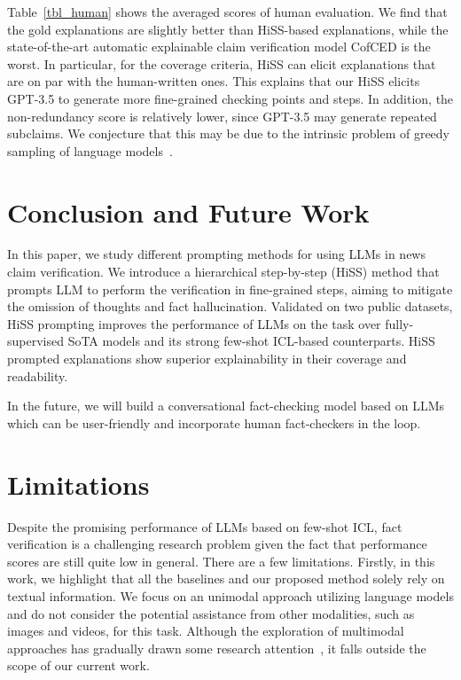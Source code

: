 \documentclass[11pt]{article}
\begin{document}
Table~\ref{tbl_human} shows the averaged scores of human evaluation. We find that the gold explanations are slightly better than HiSS-based explanations, while the state-of-the-art automatic explainable claim verification model CofCED is the worst. In particular, for the coverage criteria, HiSS can elicit explanations that are on par with the human-written ones. This explains that our HiSS elicits GPT-3.5 to generate more fine-grained checking points and steps. In addition, the non-redundancy score is relatively lower, since GPT-3.5 may generate repeated subclaims. We conjecture that this may be due to the intrinsic problem of greedy sampling of language models~\cite{holtzman2019curious}.


\section{Conclusion and Future Work}
In this paper, we study different prompting methods for using LLMs in news claim verification. We introduce a hierarchical step-by-step (HiSS) method that prompts LLM to perform the verification in fine-grained steps, aiming to mitigate the omission of thoughts and fact hallucination.
Validated on two public datasets, HiSS prompting improves the performance of LLMs on the task over fully-supervised SoTA models and its strong few-shot ICL-based counterparts. HiSS prompted explanations show superior explainability in their coverage and readability.

In the future, we will build a conversational fact-checking model based on LLMs which can be user-friendly and incorporate human fact-checkers in the loop. 


\section{Limitations}
Despite the promising performance of LLMs based on few-shot ICL, fact verification is a challenging research problem given the fact that performance scores are still quite low in general. There are a few limitations.
Firstly, in this work, we highlight that all the baselines and our proposed method solely rely on textual information. We focus on an unimodal approach utilizing language models and do not consider the potential assistance from other modalities, such as images and videos, for this task. Although the exploration of multimodal approaches has gradually drawn some research attention~\cite{wang2018eann,silva2021embracing,bu2023online}, it falls outside the scope of our current work. 
\end{document}
